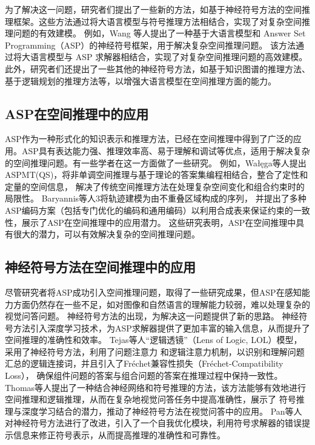 为了解决这一问题，研究者们提出了一些新的方法，如基于神经符号方法的空间推理框架。这些方法通过将大语言模型与符号推理方法相结合，实现了对复杂空间推理问题的有效建模。
例如，Wang \cite{ishay2023leveraging}等人提出了一种基于大语言模型和 Answer Set Programming（ASP）的神经符号框架，用于解决复杂空间推理问题。
该方法通过将大语言模型与 ASP 求解器相结合，实现了对复杂空间推理问题的高效建模。此外，研究者们还提出了一些其他的神经符号方法，如基于知识图谱的推理方法、基于逻辑规划的推理方法等，以增强大语言模型在空间推理方面的能力。
\subsection{ASP在空间推理中的应用}
ASP作为一种形式化的知识表示和推理方法，已经在空间推理中得到了广泛的应用。ASP具有表达能力强、推理效率高、易于理解和调试等优点，适用于解决复杂的空间推理问题。有一些学者在这一方面做了一些研究。
例如，Wałęga\cite{walega2015aspmtqs}等人提出ASPMT(QS)，将非单调空间推理与基于理论的答案集编程相结合，整合了定性和定量的空间信息，
解决了传统空间推理方法在处理复杂空间变化和组合约束时的局限性。
Baryannis\cite{Baryannis2018Trajectory}等人3将轨迹建模为由不重叠区域构成的序列，
并提出了多种ASP编码方案（包括专门优化的编码和通用编码）以利用合成表来保证约束的一致性，展示了ASP在空间推理中的应用潜力。
这些研究表明，ASP在空间推理中具有很大的潜力，可以有效解决复杂的空间推理问题。

\subsection{神经符号方法在空间推理中的应用}
尽管研究者将ASP成功引入空间推理问题，取得了一些研究成果，但ASP在感知能力方面仍然存在一些不足，如对图像和自然语言的理解能力较弱，难以处理复杂的视觉问答问题。
神经符号方法的出现，为解决这一问题提供了新的思路。
神经符号方法引入深度学习技术，为ASP求解器提供了更加丰富的输入信息，从而提升了空间推理的准确性和效率。
Tejas\cite{Gokhale2020CausalVQA}等人“逻辑透镜”（Lens of Logic, LOL）模型，采用了神经符号方法，利用了问题注意力
和逻辑注意力机制，以识别和理解问题汇总的逻辑连接词，并且引入了Fréchet兼容性损失（Fréchet-Compatibility Loss），
确保组件问题的答案与组合问题的答案在推理过程中保持一致性。
Thomas\cite{eiter2022neuro}等人提出了一种结合神经网络和符号推理的方法，该方法能够有效地进行空间推理和逻辑推理，从而在复杂地视觉问答任务中提高准确性，展示了
符号推理与深度学习结合的潜力，推动了神经符号方法在视觉问答中的应用。
Pan\cite{pan2023logic}等人对神经符号方法进行了改进，引入了一个自我优化模块，利用符号求解器的错误提示信息来修正符号表示，从而提高推理的准确性和可靠性。

